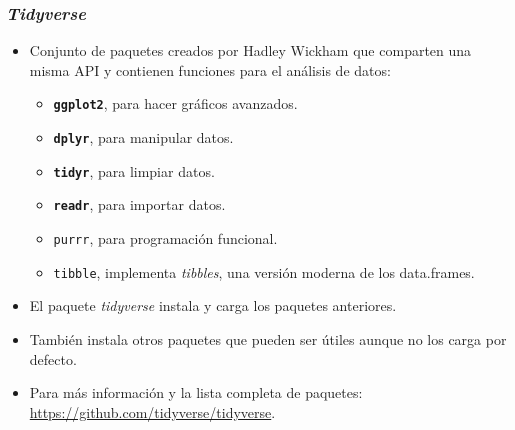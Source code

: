 \documentclass{beamer}
\begin{document}
\begin{frame}
\frametitle{\textit{Tidyverse}}

\begin{itemize}
\item Conjunto de paquetes creados por Hadley Wickham que comparten una misma API y contienen funciones para el análisis de datos:
\begin{itemize}
    \item \textbf{\texttt{ggplot2}}, para hacer gráficos avanzados.
    \item \textbf{\texttt{dplyr}}, para manipular datos.
    \item \textbf{\texttt{tidyr}}, para limpiar datos.
    \item \textbf{\texttt{readr}}, para importar datos.
    \item \texttt{purrr}, para programación funcional.
    \item \texttt{tibble}, implementa \textit{tibbles}, una versión moderna de los data.frames.
\end{itemize}

\item El paquete \textit{tidyverse} instala y carga los paquetes anteriores.

\item También instala otros paquetes que pueden ser útiles aunque no los carga por defecto.

\item Para más información y la lista completa de paquetes: \url{https://github.com/tidyverse/tidyverse}.
\end{itemize}
\end{frame}
\end{document}
